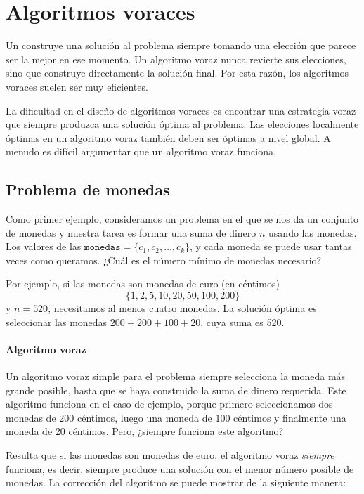 \chapter{Algoritmos voraces}


Un 
construye una solución al problema
siempre tomando una elección que parece
ser la mejor en ese momento.
Un algoritmo voraz nunca revierte
sus elecciones, sino que construye directamente
la solución final.
Por esta razón, los algoritmos voraces
suelen ser muy eficientes.

La dificultad en el diseño de algoritmos voraces
es encontrar una estrategia voraz
que siempre produzca una solución óptima
al problema.
Las elecciones localmente óptimas en un algoritmo voraz
también deben ser óptimas a nivel global.
A menudo es difícil argumentar que
un algoritmo voraz funciona.

\section{Problema de monedas}

Como primer ejemplo, consideramos un problema
en el que se nos da un conjunto de monedas
y nuestra tarea es formar una suma de dinero $n$
usando las monedas.
Los valores de las $\texttt{monedas}=\{c_1,c_2,\ldots,c_k\}$,
y cada moneda se puede usar tantas veces como queramos.
¿Cuál es el número mínimo de monedas necesario?

Por ejemplo, si las monedas son monedas de euro (en céntimos)
\[\{1,2,5,10,20,50,100,200\}\]
y $n=520$,
necesitamos al menos cuatro monedas.
La solución óptima es seleccionar las monedas
$200+200+100+20$, cuya suma es 520.

\subsubsection{Algoritmo voraz}

Un algoritmo voraz simple para el problema
siempre selecciona la moneda más grande posible,
hasta que se haya construido la suma de dinero requerida.
Este algoritmo funciona en el caso de ejemplo,
porque primero seleccionamos dos monedas de 200 céntimos,
luego una moneda de 100 céntimos y finalmente una moneda de 20 céntimos.
Pero, ¿siempre funciona este algoritmo?

Resulta que si las monedas son monedas de euro,
el algoritmo voraz \emph{siempre} funciona, es decir,
siempre produce una solución con el menor número
posible de monedas.
La corrección del algoritmo se puede
mostrar de la siguiente manera:

